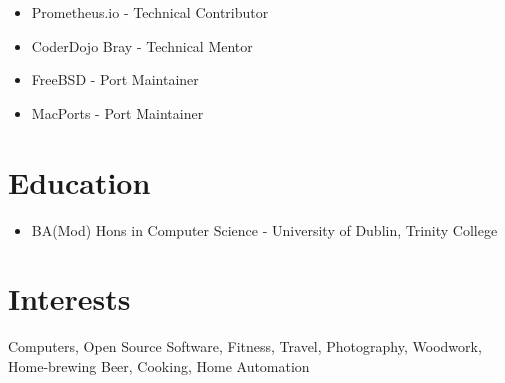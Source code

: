 \documentclass[a4paper, 10pt] {article}
\begin{document}
\begin{itemize}[noitemsep]
  \item Prometheus.io - Technical Contributor
  \item CoderDojo Bray - Technical Mentor
  \item FreeBSD - Port Maintainer
  \item MacPorts - Port Maintainer
\end{itemize}

\hrulefill

\section*{Education}

\begin{itemize}
  \item BA(Mod) Hons in Computer Science - University of Dublin, Trinity College
\end{itemize}

\hrulefill

\section*{Interests}

Computers, Open Source Software, Fitness, Travel, Photography, Woodwork,
Home-brewing Beer, Cooking, Home Automation
\end{document}
